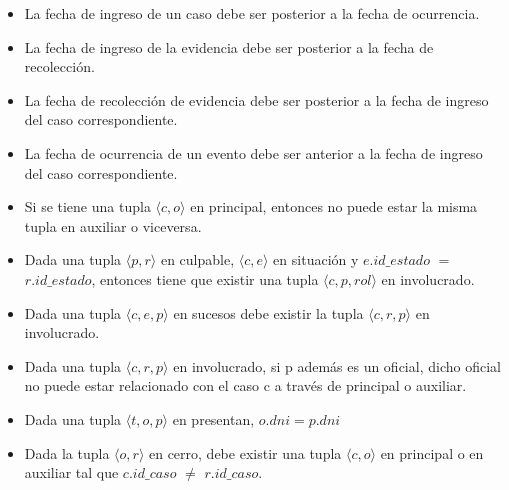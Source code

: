 \begin{itemize}
\item La fecha de ingreso de un caso debe ser posterior a la fecha de ocurrencia.

\item La fecha de ingreso de la evidencia debe ser posterior a la fecha de recolección.

\item La fecha de recolección de evidencia debe ser posterior a la fecha de ingreso del caso correspondiente.

\item La fecha de ocurrencia de un evento debe ser anterior a la fecha de ingreso del caso correspondiente.

\item Si se tiene una tupla $\langle c,o\rangle$ en principal, entonces no puede estar la misma tupla en auxiliar o viceversa.

\item Dada una tupla $\langle p,r \rangle$ en culpable, $\langle c,e \rangle$ en situación y $e.id\_estado$ $=$ $r.id\_estado$, entonces tiene que existir una tupla $\langle c,p,rol \rangle$ en involucrado.

\item Dada una tupla $\langle c,e,p \rangle$ en sucesos debe existir la tupla $\langle c,r,p \rangle$ en involucrado.

\item Dada una tupla $\langle c,r,p \rangle$ en involucrado, si p además es un oficial, dicho oficial no puede estar relacionado con el caso c a través de principal o auxiliar.

\item Dada una tupla $\langle t,o,p \rangle$ en presentan, $o.dni = p.dni$

\item Dada la tupla $\langle o,r \rangle$ en cerro, debe existir una tupla $\langle c,o \rangle$ en principal o en auxiliar tal que $c.id\_caso$ $\neq$ $r.id\_caso$.
\end{itemize}
